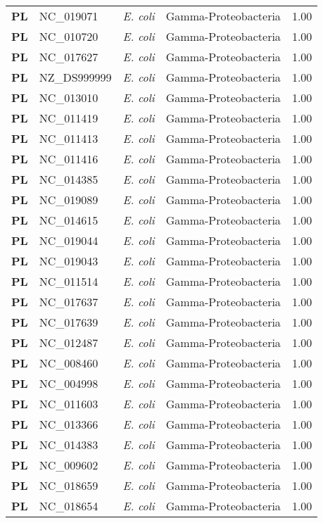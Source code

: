 \begin{adjustwidth}{-3cm}{2cm}
{\begin{supertabular}{>{\bfseries}l|p{0.1\textwidth}p{0.14\textwidth}l|l}
PL & NC\_019071 & \textit{E. coli} & Gamma-Proteobacteria & 1.00\\
PL & NC\_010720 & \textit{E. coli} & Gamma-Proteobacteria & 1.00\\
PL & NC\_017627 & \textit{E. coli} & Gamma-Proteobacteria & 1.00\\
PL & NZ\_DS999999 & \textit{E. coli} & Gamma-Proteobacteria & 1.00\\
PL & NC\_013010 & \textit{E. coli} & Gamma-Proteobacteria & 1.00\\
PL & NC\_011419 & \textit{E. coli} & Gamma-Proteobacteria & 1.00\\
PL & NC\_011413 & \textit{E. coli} & Gamma-Proteobacteria & 1.00\\
PL & NC\_011416 & \textit{E. coli} & Gamma-Proteobacteria & 1.00\\
PL & NC\_014385 & \textit{E. coli} & Gamma-Proteobacteria & 1.00\\
PL & NC\_019089 & \textit{E. coli} & Gamma-Proteobacteria & 1.00\\
PL & NC\_014615 & \textit{E. coli} & Gamma-Proteobacteria & 1.00\\
PL & NC\_019044 & \textit{E. coli} & Gamma-Proteobacteria & 1.00\\
PL & NC\_019043 & \textit{E. coli} & Gamma-Proteobacteria & 1.00\\
PL & NC\_011514 & \textit{E. coli} & Gamma-Proteobacteria & 1.00\\
PL & NC\_017637 & \textit{E. coli} & Gamma-Proteobacteria & 1.00\\
PL & NC\_017639 & \textit{E. coli} & Gamma-Proteobacteria & 1.00\\
PL & NC\_012487 & \textit{E. coli} & Gamma-Proteobacteria & 1.00\\
PL & NC\_008460 & \textit{E. coli} & Gamma-Proteobacteria & 1.00\\
PL & NC\_004998 & \textit{E. coli} & Gamma-Proteobacteria & 1.00\\
PL & NC\_011603 & \textit{E. coli} & Gamma-Proteobacteria & 1.00\\
PL & NC\_013366 & \textit{E. coli} & Gamma-Proteobacteria & 1.00\\
PL & NC\_014383 & \textit{E. coli} & Gamma-Proteobacteria & 1.00\\
PL & NC\_009602 & \textit{E. coli} & Gamma-Proteobacteria & 1.00\\
PL & NC\_018659 & \textit{E. coli} & Gamma-Proteobacteria & 1.00\\
PL & NC\_018654 & \textit{E. coli} & Gamma-Proteobacteria & 1.00\\

\end{supertabular}}
\end{adjustwidth}
